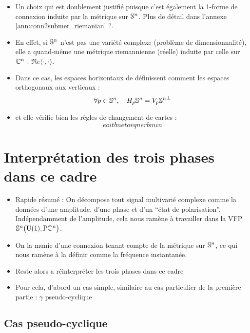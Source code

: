 \begin{itemize}
	\item Un choix qui est doublement justifié puisque c'est également la 1-forme de connexion induite par la métrique sur $\S{n}$. Plus de détail dans l'annexe \ref{ann:conn2submer_riemanian} ?.
	
	\item En effet, si $\S{n}$ n'est pas une variété complexe (problème de dimensionnalité), elle a quand-même une métrique riemannienne (réelle) induite par celle sur $\C^n$ : $\Re e\langle \cdot,\cdot\rangle$.
	
	\item Dans ce cas, les espaces horizontaux de définissent comment les espaces orthogonaux aux verticaux : 
	\[\forall p\in\S{n},\quad \hg[p]{\S{n}} = {\vg[p]{\S{n}}}^\perp\]
	
	\item et elle vérifie bien les règles de changement de cartes :
	\[eoitbnetovqnerbmin\]
	
\end{itemize}






\section{Interprétation des trois phases dans ce cadre} \label{sec:phases_dans_VFP}

\begin{itemize}
	
	\item Rapide résumé : On décompose tout signal multivarié complexe comme la données d'une amplitude, d'une phase et d'un ``état de polarisation''. Indépendamment de l'amplitude, cela nous ramène à travailler dans la VFP $\VFP$.
	
	\item On la munie d'une connexion tenant compte de la métrique sur $\S{n}$, ce qui nous ramène à la définir comme la fréquence instantanée.
	
	\item Reste alors a réinterpréter les trois phases dans ce cadre
	
	\item Pour cela, d'abord un cas simple, similaire au cas particulier de la première partie : $\gamma$ pseudo-cyclique
\end{itemize}

\subsection{Cas pseudo-cyclique}

